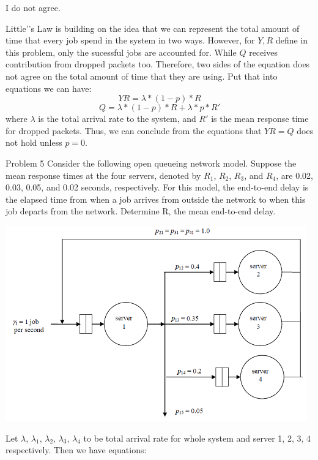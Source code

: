 \documentclass[letterpaper]{article}
\begin{document}
\begin{enumerate}
I do not agree.

Little'’s Law is building on the idea that we can represent the total amount of time that every job spend in the system in two ways. However, for $Y, R$ define in this problem, only the sucessful jobs are accounted for. While $Q$ receives contribution from dropped packets too. Therefore, two sides of the equation does not agree on the total amount of time that they are using. Put that into equations we can have:
\begin{equation}
YR = \lambda * (1 - p) * R
\end{equation}
\begin{equation}
Q = \lambda * (1 - p) * R + \lambda * p * R'
\end{equation}
where $\lambda$ is the total arrival rate to the system, and $R'$ is the mean response time for dropped packets. Thus, we can conclude from the equations that $YR = Q$ does not hold unless $p = 0$.
\medskip

\begin{minipage}{\textwidth}
\item{Problem 5}
Consider the following open queueing network model. Suppose the mean response times at the four servers, denoted by $R_1$, $R_2$, $R_3$, and $R_4$, are 0.02, 0.03, 0.05, and 0.02 seconds, respectively. For this model, the end-to-end delay is the elapsed time from when a job arrives from outside the network to when this job departs from the network. Determine R, the mean end-to-end delay.

\includegraphics[width=\textwidth]{a1q5.png}
\end{minipage}

Let $\lambda$, $\lambda_1$, $\lambda_2$, $\lambda_3$, $\lambda_4$ to be total arrival rate for whole system and server 1, 2, 3, 4 respectively. Then we have equations:


\end{enumerate}
\end{document}

